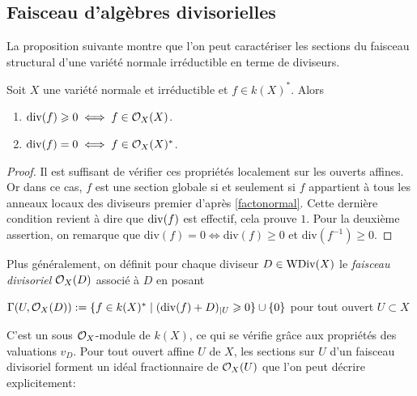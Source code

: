 \subsection{Faisceau d'algèbres divisorielles}

La proposition suivante montre que l'on peut caractériser les sections du faisceau structural d'une variété normale irréductible en terme de diviseurs.

\begin{prop}\label{caracfaisceaustructdiv}
Soit $X$ une variété normale et irréductible et $f\in k(X)^*$. Alors 
\begin{enumerate}
\item $\operatorname{div}(f)\geqslant 0\iff f \in\mathcal{O}_X(X)$.
\item $\operatorname{div}(f)= 0\iff f\in\mathcal{O}_X(X)^*$.
\end{enumerate}
\end{prop}
\begin{proof}
Il est suffisant de vérifier ces propriétés localement sur les ouverts affines. Or dans ce cas, $f$ est une section globale si et seulement si $f$ appartient à tous les anneaux locaux des diviseurs premier d'après \ref{factonormal}. Cette dernière condition revient à dire que $\operatorname{div}(f)$ est effectif, cela prouve $1$. Pour la deuxième assertion, on remarque que div$(f)=0\iff$div$(f)\geq 0$ et div$(f^{-1})\geq 0$.
\end{proof}

Plus généralement, on définit pour chaque diviseur $D\in \operatorname{WDiv}(X)$ le \textit{faisceau divisoriel} $\mathcal{O}_X(D)$ associé à $D$ en posant
\begin{center}
$\Gamma(U,\mathcal{O}_X(D)):=\lbrace f\in k(X)^* \mid (\textrm{div}(f)+D)_{|U}\geqslant 0\rbrace\cup \lbrace 0 \rbrace$ pour tout ouvert $U\subset X$
\end{center}
C'est un sous $\mathcal{O}_X$-module de $k(X)$, ce qui se vérifie grâce aux propriétés des valuations $v_D$. Pour tout ouvert affine $U$ de $X$, les sections sur $U$ d'un faisceau divisoriel forment un idéal fractionnaire de $\mathcal{O}_X(U)$ que l'on peut décrire explicitement:

